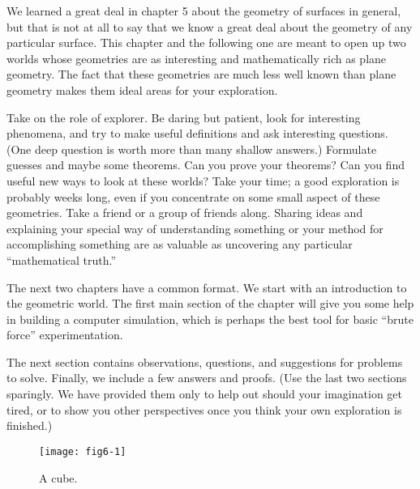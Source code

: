 \documentclass{book}
\begin{document}
We learned a great deal in chapter 5 about the geometry of surfaces in
general, but that is not at all to say that we know a great deal about the
geometry of any particular surface. This chapter and the following one
are meant to open up two worlds whose geometries are as interesting and
mathematically rich as plane geometry. The fact that these geometries
are much less well known than plane geometry makes them ideal areas
for your exploration.

Take on the role of explorer. Be daring but patient, look for interesting phenomena, and try to make useful definitions and ask interesting questions. (One deep question is worth more than many shallow
answers.) Formulate guesses and maybe some theorems. Can you prove
your theorems? Can you find useful new ways to look at these worlds?
Take your time; a good exploration is probably weeks long, even if you
concentrate on some small aspect of these geometries. Take a friend or a
group of friends along. Sharing ideas and explaining your special way of
understanding something or your method for accomplishing something
are as valuable as uncovering any particular ``mathematical truth.''

The next two chapters have a common format. We start with an
introduction to the geometric world. The first main section of the
chapter will give you some help in building a computer simulation,
which is perhaps the best tool for basic ``brute force'' experimentation.

The next section contains observations, questions, and suggestions for
problems to solve. Finally, we include a few answers and proofs. (Use
the last two sections sparingly. We have provided them only to help
out should your imagination get tired, or to show you other perspectives
once you think your own exploration is finished.)

\begin{figure}
\begin{center}
\texttt{[image: fig6-1]}
\caption{A cube.}
\end{center}
\end{figure}
\end{document}
